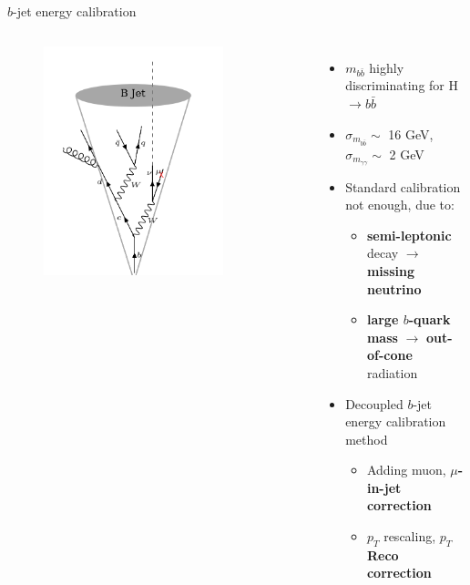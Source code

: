 \begin{frame}{$b$-jet energy calibration}
\begin{columns}
\begin{figure}
    \centering
    \includegraphics[width=0.8\textwidth]{Part3/Img/b-jet.png}
\end{figure}


\begin{itemize}
    \item $m_{b\bar{b}}$ highly discriminating for H$\to b\bar{b}$
    \item $\sigma_{m_{b\bar{b}}}\sim$ 16 GeV, $\sigma_{m_{\gamma\gamma}}\sim$ 2 GeV
    \item Standard calibration not enough, due to: 
    \begin{itemize}
        \item \textcolor{HHred}{\textbf{semi-leptonic}} decay $\to$ \textbf{missing neutrino}
        \item \textcolor{HHturquoise_d}{\textbf{large $b$-quark mass}} $\to$ \textbf{out-of-cone} radiation
    \end{itemize}
\pause    
    \item Decoupled $b$-jet energy calibration method
    \begin{itemize}
        \item Adding muon, \textcolor{HHred}{\textbf{$\mu$-in-jet correction}}
        \item $p_T$ rescaling, \textcolor{HHturquoise_d}{\textbf{$p_T$Reco correction}}
    \end{itemize}
\end{itemize}
\end{columns}
\end{frame}


